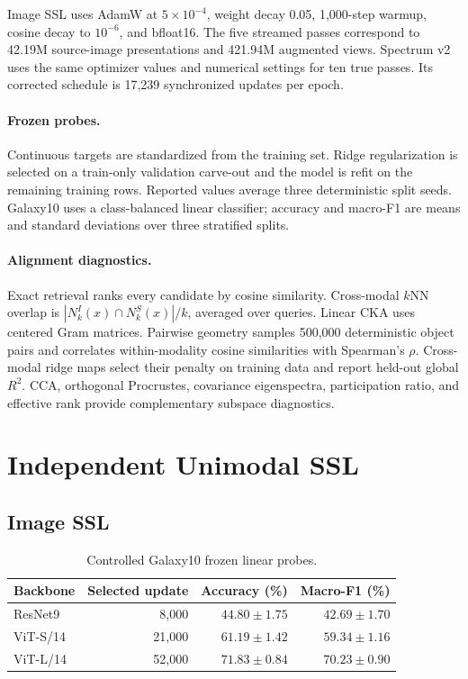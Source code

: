 \documentclass{article}
\newcommand{\rscore}{$R^2$}
\begin{document}
Image SSL uses AdamW at $5\times10^{-4}$, weight decay 0.05, 1,000-step
warmup, cosine decay to $10^{-6}$, and bfloat16.
The five streamed passes correspond to 42.19M source-image presentations and
421.94M augmented views.
Spectrum v2 uses the same optimizer values and numerical settings for ten true
passes.
Its corrected schedule is 17,239 synchronized updates per epoch.

\paragraph{Frozen probes.}
Continuous targets are standardized from the training set.
Ridge regularization is selected on a train-only validation carve-out and the
model is refit on the remaining training rows.
Reported values average three deterministic split seeds.
Galaxy10 uses a class-balanced linear classifier; accuracy and macro-F1 are
means and standard deviations over three stratified splits.

\paragraph{Alignment diagnostics.}
Exact retrieval ranks every candidate by cosine similarity.
Cross-modal $k$NN overlap is
$|N_k^I(x)\cap N_k^S(x)|/k$, averaged over queries.
Linear CKA uses centered Gram matrices.
Pairwise geometry samples 500,000 deterministic object pairs and correlates
within-modality cosine similarities with Spearman's $\rho$.
Cross-modal ridge maps select their penalty on training data and report held-out
global \rscore.
CCA, orthogonal Procrustes, covariance eigenspectra, participation ratio, and
effective rank provide complementary subspace diagnostics.

\FloatBarrier
\section{Independent Unimodal SSL}
\label{app:unimodal}

\subsection{Image SSL}

\begin{table}[h]
\centering
\caption{Controlled Galaxy10 frozen linear probes.}
\label{tab:image_galaxy10}
\small
\begin{tabular}{lrrr}
\toprule
Backbone & Selected update & Accuracy (\%) & Macro-F1 (\%)\\
\midrule
ResNet9 & 8,000 & $44.80\pm1.75$ & $42.69\pm1.70$\\
ViT-S/14 & 21,000 & $61.19\pm1.42$ & $59.34\pm1.16$\\
ViT-L/14 & 52,000 & $\mathbf{71.83\pm0.84}$ & $\mathbf{70.23\pm0.90}$\\
\bottomrule
\end{tabular}
\end{table}
\end{document}
